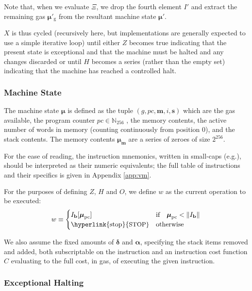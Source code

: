 \documentclass[9pt,oneside]{amsart}
\makeatletter
\newcommand{\linkdest}[1]{\Hy@raisedlink{\hypertarget{#1}{}}}
\newcommand*\eg{e.g.\@\xspace}
\makeatother
\begin{document}
\begin{multicols}{2}
Note that, when we evaluate $\Xi$, we drop the fourth element $I'$ and extract the remaining gas $\boldsymbol{\mu}'_{\mathrm{g}}$ from the resultant machine state $\boldsymbol{\mu}'$.

$X$ is thus cycled (recursively here, but implementations are generally expected to use a simple iterative loop) until either \hyperlink{zhalt}{$Z$} becomes true indicating that the present state is exceptional and that the machine must be halted and any changes discarded or until \hyperlink{hhalt}{$H$} becomes a series (rather than the empty set) indicating that the machine has reached a controlled halt.

\subsubsection{Machine State}
The machine state $\boldsymbol{\mu}$ is defined as the tuple $(g, pc, \mathbf{m}, i, \mathbf{s})$ which are the gas available, the program counter $pc \in \mathbb{N}_{256}$ , the memory contents, the active number of words in memory (counting continuously from position 0), and the stack contents. The memory contents $\boldsymbol{\mu}_{\mathbf{m}}$ are a series of zeroes of size $2^{256}$.

For the ease of reading, the instruction mnemonics, written in small-caps (\eg {}), should be interpreted as their numeric equivalents; the full table of instructions and their specifics is given in Appendix \ref{app:vm}.

For the purposes of defining $Z$, $H$ and $O$, we define $w$ as the current operation to be executed:
\begin{equation}\label{eq:currentoperation}
w \equiv \begin{cases} I_{\mathbf{b}}[\boldsymbol{\mu}_{\mathrm{pc}}] & \text{if} \quad \boldsymbol{\mu}_{\mathrm{pc}} < \lVert I_{\mathbf{b}} \rVert \\
\text{\hyperlink{stop}{\small STOP}} & \text{otherwise}
\end{cases}
\end{equation}

We also assume the fixed amounts of $\mathbf{\delta}$ and $\mathbf{\alpha}$, specifying the stack items removed and added, both subscriptable on the instruction and an instruction cost function $C$ evaluating to the full cost, in gas, of executing the given instruction.

\subsubsection{Exceptional Halting}\hypertarget{Exceptional_Halting_function_Z}{}\linkdest{zhalt}


\end{multicols}
\end{document}
